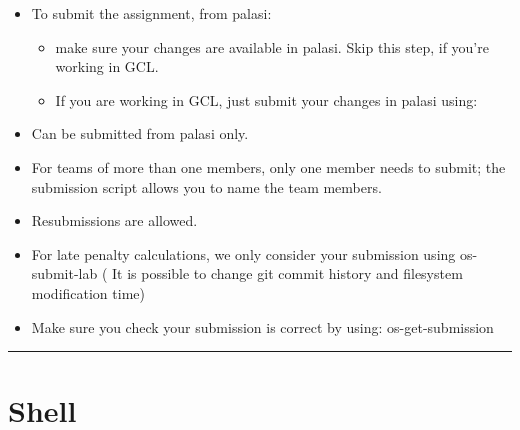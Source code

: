 \documentclass[]{article}
\newenvironment{Shaded}{}{}
\newcommand{\OperatorTok}[1]{{#1}}
\newcommand{\ExtensionTok}[1]{{#1}}
\newcommand{\NormalTok}[1]{{#1}}
\providecommand{\tightlist}{%
  \setlength{\itemsep}{0pt}\setlength{\parskip}{0pt}}
\begin{document}
\begin{itemize}
\tightlist
\item
  To submit the assignment, from palasi:

  \begin{itemize}
  \item
    make sure your changes are available in palasi. Skip this step, if
    you're working in GCL.

\begin{Shaded}
\end{Shaded}
  \item
    If you are working in GCL, just submit your changes in palasi using:

\begin{Shaded}
\end{Shaded}
  \end{itemize}
\item
  Can be submitted from palasi only.
\item
  For teams of more than one members, only one member needs to submit;
  the submission script allows you to name the team members.
\item
  Resubmissions are allowed.
\item
  For late penalty calculations, we only consider your submission using
  os-submit-lab ( It is possible to change git commit history and
  filesystem modification time)
\item
  Make sure you check your submission is correct by using:
  os-get-submission
\end{itemize}

\begin{center}\rule{0.5\linewidth}{\linethickness}\end{center}

\section{Shell}\label{shell}
\end{document}
